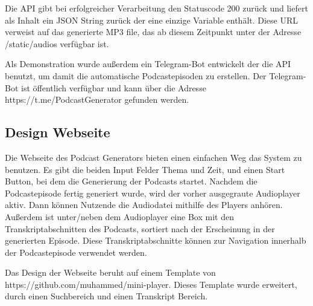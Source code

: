 Die API gibt bei erfolgreicher Verarbeitung den Statuscode 200 zurück und liefert als Inhalt ein JSON String zurück der eine einzige Variable  enthält.
Diese URL verweist auf das generierte MP3 file, das ab diesem Zeitpunkt unter der Adresse /static/audios verfügbar ist.

Als Demonstration wurde außerdem ein Telegram-Bot entwickelt der die API benutzt, um damit die automatische Podcastepisoden zu erstellen.
Der Telegram-Bot ist öffentlich verfügbar und kann über die Adresse https://t.me/PodcastGenerator gefunden werden.

\subsection{Design Webseite}

Die Webseite des Podcast Generators bieten einen einfachen Weg das System zu benutzen.
Es gibt die beiden Input Felder Thema und Zeit, und einen Start Button, bei dem die Generierung der Podcasts startet.
Nachdem die Podcastepisode fertig generiert wurde, wird der vorher ausgegraute Audioplayer aktiv.
Dann können Nutzende die Audiodatei mithilfe des Players anhören.
Außerdem ist unter/neben dem Audioplayer eine Box mit den Transkriptabschnitten des Podcasts, sortiert nach der Erscheinung in der generierten Episode.
Diese Transkriptabschnitte können zur Navigation innerhalb der Podcastepisode verwendet werden.


Das Design der Webseite beruht auf einem Template von https://github.com/muhammed/mini-player.
Dieses Template wurde erweitert, durch einen Suchbereich und einen Transkript Bereich.



